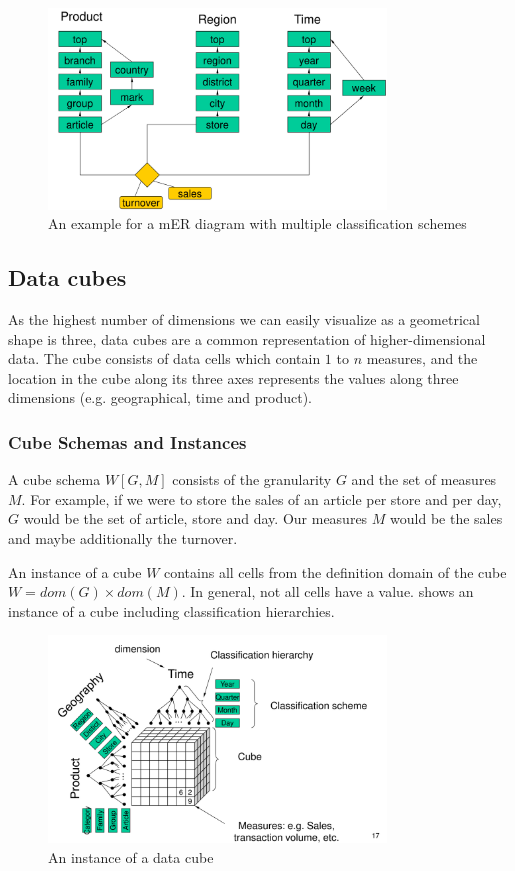 \documentclass{article}
\begin{document}
\begin{figure}[h]
    \centering
    \includegraphics[width=0.8\textwidth]{schema.png}
    \caption{An example for a mER diagram with multiple classification schemes}
    \label{fig:schema}
\end{figure}

\subsection{Data cubes}
As the highest number of dimensions we can easily visualize as a geometrical shape is three, data cubes are a common representation of higher-dimensional data.
The cube consists of data cells which contain $1$ to $n$ measures, and the location in the cube along its three axes represents the values along three dimensions (e.g. geographical, time and product).

\subsubsection{Cube Schemas and Instances}
A cube schema $W\left[G,M\right]$ consists of the granularity $G$ and the set of measures $M$.
For example, if we were to store the sales of an article per store and per day, $G$ would be the set of article, store and day.
Our measures $M$ would be the sales and maybe additionally the turnover.

An instance of a cube $W$ contains all cells from the definition domain of the cube $W = dom(G) \times dom(M)$.
In general, not all cells have a value.
 shows an instance of a cube including classification hierarchies.

\begin{figure}[h]
    \centering
    \includegraphics[width=0.8\textwidth]{cube.png}
    \caption{An instance of a data cube}
    \label{fig:cube}
\end{figure}
\end{document}
